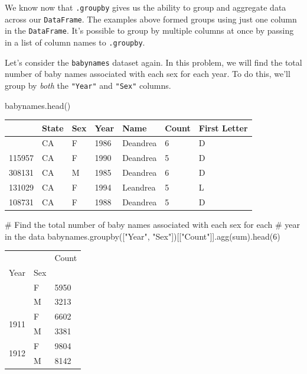 \documentclass[
  letterpaper,
  DIV=11,
  numbers=noendperiod]{scrreprt}
\newenvironment{Shaded}{\begin{snugshade}}{\end{snugshade}}
\newcommand{\BuiltInTok}[1]{\textcolor[rgb]{0.00,0.23,0.31}{#1}}
\newcommand{\CommentTok}[1]{\textcolor[rgb]{0.37,0.37,0.37}{#1}}
\newcommand{\DecValTok}[1]{\textcolor[rgb]{0.68,0.00,0.00}{#1}}
\newcommand{\NormalTok}[1]{\textcolor[rgb]{0.00,0.23,0.31}{#1}}
\newcommand{\StringTok}[1]{\textcolor[rgb]{0.13,0.47,0.30}{#1}}
\begin{document}
We know now that \texttt{.groupby} gives us the ability to group and
aggregate data across our \texttt{DataFrame}. The examples above formed
groups using just one column in the \texttt{DataFrame}. It's possible to
group by multiple columns at once by passing in a list of column names
to \texttt{.groupby}.

Let's consider the \texttt{babynames} dataset again. In this problem, we
will find the total number of baby names associated with each sex for
each year. To do this, we'll group by \emph{both} the \texttt{"Year"}
and \texttt{"Sex"} columns.

\begin{Shaded}
\begin{Highlighting}[]
\NormalTok{babynames.head()}
\end{Highlighting}
\end{Shaded}

\begin{longtable}[]{@{}lllllll@{}}
\toprule\noalign{}
& State & Sex & Year & Name & Count & First Letter \\
\midrule\noalign{}
\endhead
\bottomrule\noalign{}
\endlastfoot
101976 & CA & F & 1986 & Deandrea & 6 & D \\
115957 & CA & F & 1990 & Deandrea & 5 & D \\
308131 & CA & M & 1985 & Deandrea & 6 & D \\
131029 & CA & F & 1994 & Leandrea & 5 & L \\
108731 & CA & F & 1988 & Deandrea & 5 & D \\
\end{longtable}

\begin{Shaded}
\begin{Highlighting}[]
\CommentTok{\# Find the total number of baby names associated with each sex for each }
\CommentTok{\# year in the data}
\NormalTok{babynames.groupby([}\StringTok{"Year"}\NormalTok{, }\StringTok{"Sex"}\NormalTok{])[[}\StringTok{"Count"}\NormalTok{]].agg(}\BuiltInTok{sum}\NormalTok{).head(}\DecValTok{6}\NormalTok{)}
\end{Highlighting}
\end{Shaded}

\begin{longtable}[]{@{}lll@{}}
\toprule\noalign{}
& & Count \\
Year & Sex & \\
\midrule\noalign{}
\endhead
\bottomrule\noalign{}
\endlastfoot
\multirow{2}{=}{1910} & F & 5950 \\
& M & 3213 \\
\multirow{2}{=}{1911} & F & 6602 \\
& M & 3381 \\
\multirow{2}{=}{1912} & F & 9804 \\
& M & 8142 \\
\end{longtable}
\end{document}
